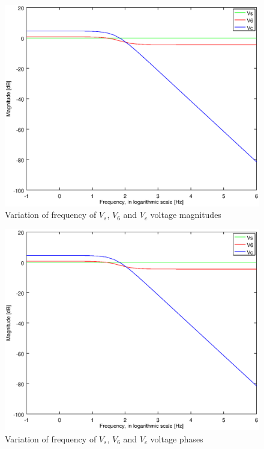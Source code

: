 \begin{figure}[!h]
	\centering
	\includegraphics[width=0.7\linewidth]{magnitude.eps}
	\caption{Variation of frequency of $V_s$, $V_6$ and $V_c$ voltage magnitudes}
\end{figure}

\begin{figure}[!h]
	\centering
	\includegraphics[width=0.7\linewidth]{magnitude.eps}
	\caption{Variation of frequency of $V_s$, $V_6$ and $V_c$ voltage phases}
\end{figure}



